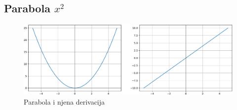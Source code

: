 \documentclass[times, utf8, numeric, diplomski]{fer}
\def\otherwise{\textit{inače}}
\begin{document}
%

\subsection{Parabola $x^2$}

\begin{figure}[H]
\includegraphics[width=\textwidth]{Pow2.pdf}
\centering
\caption{Parabola i njena derivacija}
\end{figure}
\end{document}
